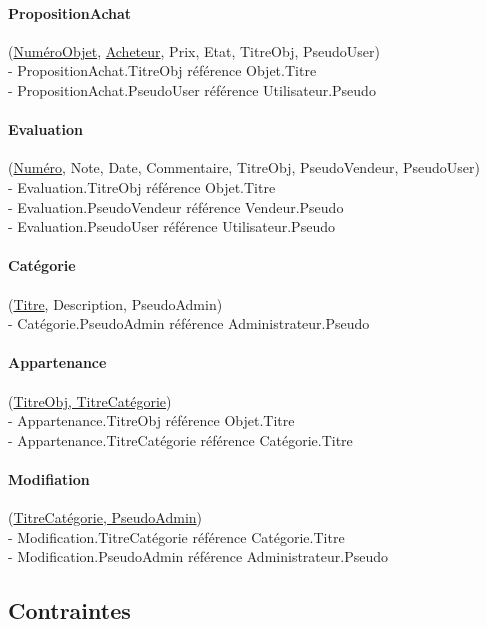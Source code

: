\documentclass[a4paper,11pt]{article}
\begin{document}
\paragraph{PropositionAchat} (\underline{NuméroObjet}, \underline{Acheteur}, Prix, Etat, TitreObj, PseudoUser)\\
\indent - PropositionAchat.TitreObj référence Objet.Titre\\
\indent - PropositionAchat.PseudoUser référence Utilisateur.Pseudo


\paragraph{Evaluation} (\underline{Numéro}, Note, Date, Commentaire, TitreObj, PseudoVendeur, PseudoUser)\\
\indent - Evaluation.TitreObj référence Objet.Titre\\
\indent - Evaluation.PseudoVendeur référence Vendeur.Pseudo\\
\indent - Evaluation.PseudoUser référence Utilisateur.Pseudo


\paragraph{Catégorie} (\underline{Titre}, Description, PseudoAdmin)\\
\indent - Catégorie.PseudoAdmin référence Administrateur.Pseudo


\paragraph{Appartenance} (\underline{TitreObj, TitreCatégorie})\\
\indent - Appartenance.TitreObj référence Objet.Titre\\
\indent - Appartenance.TitreCatégorie référence Catégorie.Titre


\paragraph{Modifiation} (\underline{TitreCatégorie, PseudoAdmin})\\
\indent - Modification.TitreCatégorie référence Catégorie.Titre\\
\indent - Modification.PseudoAdmin référence Administrateur.Pseudo


\subsection{Contraintes}
\end{document}
